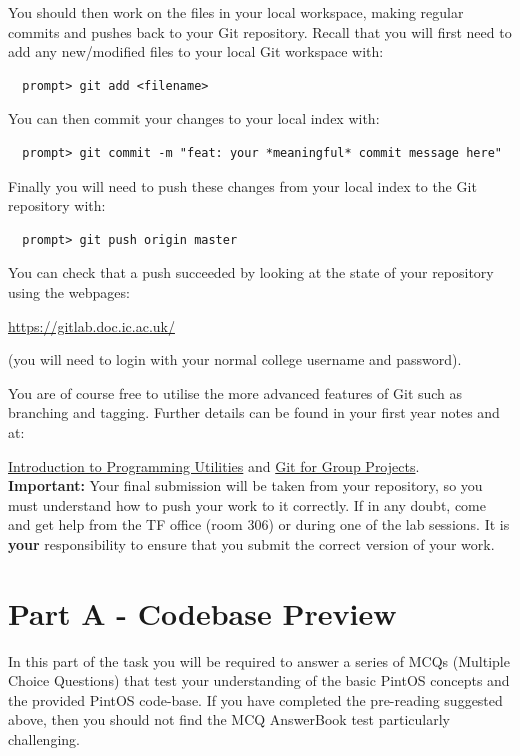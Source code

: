 \documentclass[a4paper,11pt]{article}
\begin{document}
You should then work on the files in your local workspace, making regular commits and pushes back to your  Git repository.
Recall that you will first need to add any new/modified files to your local Git workspace with:
%
\begin{verbatim}
  prompt> git add <filename>
\end{verbatim}
%
You can then commit your changes to your local index with:
%
\begin{verbatim}
  prompt> git commit -m "feat: your *meaningful* commit message here"
\end{verbatim}
%
Finally you will need to push these changes from your local index to the Git repository with:
%
\begin{verbatim}
  prompt> git push origin master
\end{verbatim}
%
You can check that a push succeeded by looking at the state of your repository using the  webpages:

\url{https://gitlab.doc.ic.ac.uk/}

\noindent (you will need to login with your normal college username and password).

You are of course free to utilise the more advanced features of Git such as branching and tagging.
Further details can be found in your first year notes and at:

\href{https://scientia.doc.ic.ac.uk/api/resources/12739/file/DoCSoc\%20-\%20Basics\%20of\%20Git\%20and\%20GitLab.pdf}{Introduction to Programming Utilities}
and
\href{https://scientia.doc.ic.ac.uk/api/resources/15719/file/DoCSoC\%20-\%20Git\%20for\%20Group\%20Projects.pdf}{Git for Group Projects}.\\

{\bf Important:} Your final submission will be taken from your   repository,
so you must understand how to push your work to it correctly. 
If in any doubt, come and get help from the TF office (room 306) or during one of the lab sessions.
It is {\bf your} responsibility to ensure that you submit the correct version of your work.


\section*{Part A - Codebase Preview}
In this part of the task you will be required to answer a series of MCQs (Multiple Choice Questions) that test your understanding of the basic PintOS concepts and the provided PintOS code-base.
If you have completed the pre-reading suggested above, then you should not find the MCQ AnswerBook test particularly challenging.
\end{document}
